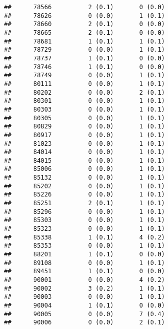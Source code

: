 \documentclass[]{article}
\begin{document}
\begin{verbatim}
##      78566          2 (0.1)       0 (0.0)                        
##      78626          0 (0.0)       1 (0.1)                        
##      78660          2 (0.1)       0 (0.0)                        
##      78665          2 (0.1)       0 (0.0)                        
##      78681          1 (0.1)       1 (0.1)                        
##      78729          0 (0.0)       1 (0.1)                        
##      78737          1 (0.1)       0 (0.0)                        
##      78746          1 (0.1)       0 (0.0)                        
##      78749          0 (0.0)       1 (0.1)                        
##      80111          0 (0.0)       1 (0.1)                        
##      80202          0 (0.0)       2 (0.1)                        
##      80301          0 (0.0)       1 (0.1)                        
##      80303          0 (0.0)       1 (0.1)                        
##      80305          0 (0.0)       1 (0.1)                        
##      80829          0 (0.0)       1 (0.1)                        
##      80917          0 (0.0)       1 (0.1)                        
##      81023          0 (0.0)       1 (0.1)                        
##      84014          0 (0.0)       1 (0.1)                        
##      84015          0 (0.0)       1 (0.1)                        
##      85006          0 (0.0)       1 (0.1)                        
##      85132          0 (0.0)       1 (0.1)                        
##      85202          0 (0.0)       1 (0.1)                        
##      85226          0 (0.0)       1 (0.1)                        
##      85251          2 (0.1)       1 (0.1)                        
##      85296          0 (0.0)       1 (0.1)                        
##      85303          0 (0.0)       1 (0.1)                        
##      85323          0 (0.0)       1 (0.1)                        
##      85338          1 (0.1)       4 (0.2)                        
##      85353          0 (0.0)       1 (0.1)                        
##      88201          1 (0.1)       0 (0.0)                        
##      89108          0 (0.0)       1 (0.1)                        
##      89451          1 (0.1)       0 (0.0)                        
##      90001          0 (0.0)       4 (0.2)                        
##      90002          3 (0.2)       1 (0.1)                        
##      90003          0 (0.0)       1 (0.1)                        
##      90004          1 (0.1)       0 (0.0)                        
##      90005          0 (0.0)       7 (0.4)                        
##      90006          0 (0.0)       2 (0.1)                        

\end{verbatim}
\end{document}
